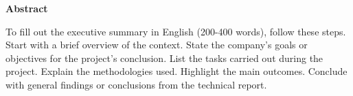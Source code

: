 

{\Large\textbf{Abstract}}\par

To fill out the executive summary in English (200-400 words), follow these steps. Start with a brief overview of the context. State the company's goals or objectives for the project's conclusion. List the tasks carried out during the project. Explain the methodologies used. Highlight the main outcomes. Conclude with general findings or conclusions from the technical report.

\newpage